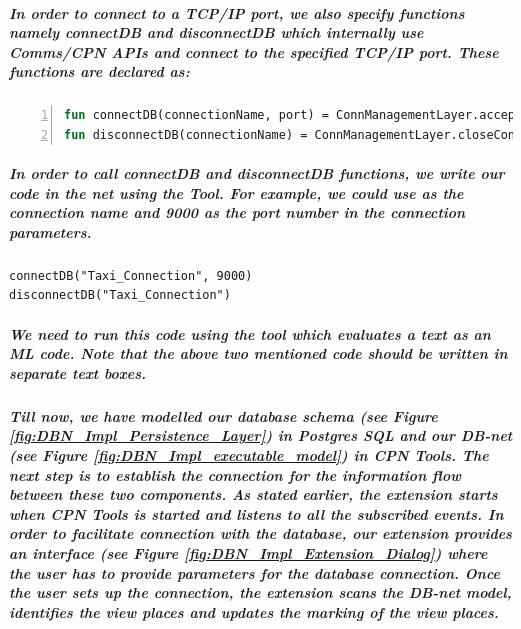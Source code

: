 \subparagraph*{\textnormal{In order to connect to a TCP/IP port, we also specify functions namely \textit{connectDB} and \textit{disconnectDB} which internally use Comms/CPN APIs and connect to the specified TCP/IP port. These functions are declared as:}}

\subparagraph*{}
\begin{lstlisting}[showstringspaces=false, language = ML, caption = {Functions for acquiring random phone number, random address and random time}, captionpos=b, label = lst:DBN_Impl_Connect_Disconnect,numbers=left,
stepnumber=1]
fun connectDB(connectionName, port) = ConnManagementLayer.acceptConnection(connectionName, port);
fun disconnectDB(connectionName) = ConnManagementLayer.closeConnection(connectionName);
\end{lstlisting}
\subparagraph*{\textnormal{In order to call \textit{connectDB} and \textit{disconnectDB} functions, we write our code in the net using the  Tool. For example, we could use  as the connection name and 9000 as the port number in the connection parameters.}}
\begin{verbatim}
connectDB("Taxi_Connection", 9000)
disconnectDB("Taxi_Connection")
\end{verbatim}

\subparagraph*{\textnormal{We need to run this code using the  tool which evaluates a text as an ML code. Note that the above two mentioned code should be written in separate text boxes.}}

\subparagraph*{\textnormal{Till now, we have modelled our database schema (see Figure \ref{fig:DBN_Impl_Persistence_Layer}) in Postgres SQL and our DB-net (see Figure \ref{fig:DBN_Impl_executable_model}) in CPN Tools. The next step is to establish the connection for the information flow between these two components. As stated earlier, the extension starts when CPN Tools is started and listens to all the subscribed events. In order to facilitate connection with the database, our extension provides an interface (see Figure \ref{fig:DBN_Impl_Extension_Dialog}) where the user has to provide parameters for the database connection. Once the user sets up the connection, the extension scans the DB-net model, identifies the view places and updates the marking of the view places.}}

